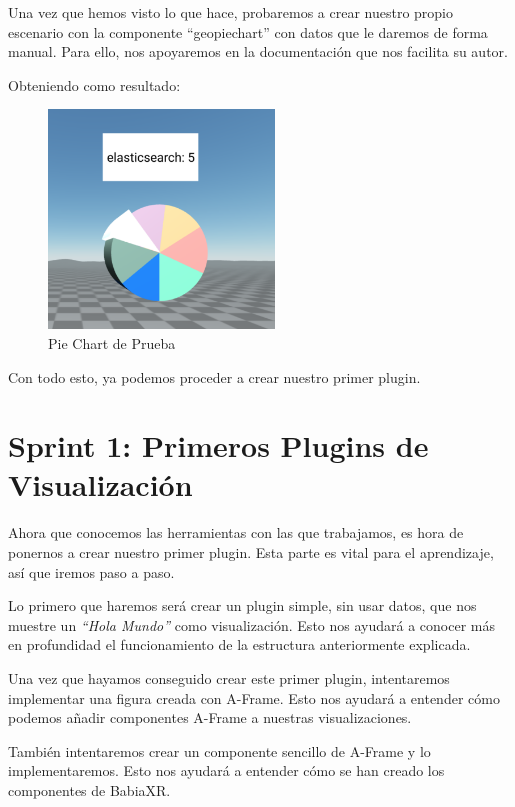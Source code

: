 \documentclass[a4paper, 12pt]{book}
\begin{document}
Una vez que hemos visto lo que hace, probaremos a crear nuestro propio escenario con la componente “geopiechart” con datos que le daremos de forma manual. Para ello, nos apoyaremos en la documentación que nos facilita su autor.



Obteniendo como resultado:

\begin{figure}[H]
  \centering
  \includegraphics[width=6cm, keepaspectratio]{img/development/prueba-babiaxr.png}
  \caption{Pie Chart de Prueba}
  \label{fig:pruebababiaxr}
\end{figure}

Con todo esto, ya podemos proceder a crear nuestro primer plugin.



\section{Sprint 1: Primeros Plugins de Visualización }
\label{sec:sprint1}

Ahora que conocemos las herramientas con las que trabajamos, es hora de ponernos a crear nuestro primer plugin. Esta parte es vital para el aprendizaje, así que iremos paso a paso.

Lo primero que haremos será crear un plugin simple, sin usar datos, que nos muestre un \textit{“Hola Mundo”} como visualización. Esto nos ayudará a conocer más en profundidad el funcionamiento  de la estructura anteriormente explicada.

Una vez que hayamos conseguido crear este primer plugin, intentaremos implementar una figura creada con A-Frame. Esto nos ayudará a entender cómo podemos añadir componentes A-Frame a nuestras visualizaciones.

También intentaremos crear un componente sencillo de A-Frame y lo implementaremos. Esto nos ayudará a entender cómo se han creado los componentes de BabiaXR.
\end{document}
